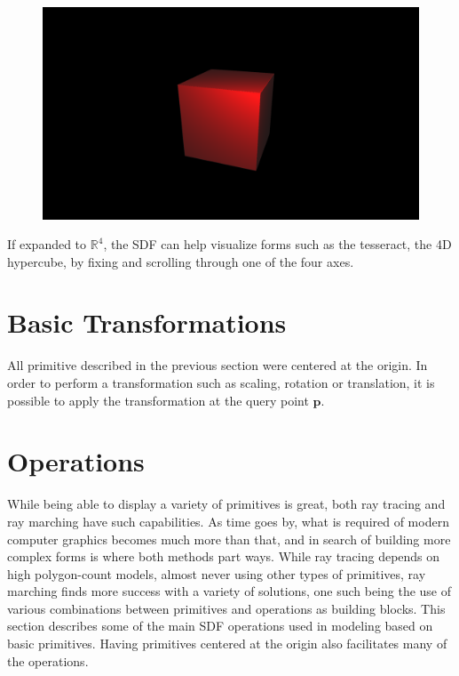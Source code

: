 \begin{figure}[ht]
    \centering
  \includegraphics[width=.6\linewidth]{imagens/sdf-cube.png}
  \label{fig:sdf-cube}
\end{figure}


If expanded to $\mathbb{R}^4 $, the SDF can help visualize forms such as the tesseract, the 4D hypercube, by fixing and scrolling through one of the four axes.

\section{Basic Transformations}

All primitive described in the previous section were centered at the origin. In order to perform a transformation such as scaling, rotation or translation, it is possible to apply the transformation at the query point $\mathbf{p}$.



\section{Operations}

While being able to display a variety of primitives is great, both ray tracing and ray marching have such capabilities. As time goes by, what is required of modern computer graphics becomes much more than that, and in search of building more complex forms is where both methods part ways. While ray tracing depends on high polygon-count models, almost never using other types of primitives, ray marching finds more success with a variety of solutions, one such being the use of various combinations between primitives and operations as building blocks.
This section describes some of the main SDF operations used in modeling based on basic primitives. Having primitives centered at the origin also facilitates many of the operations.

